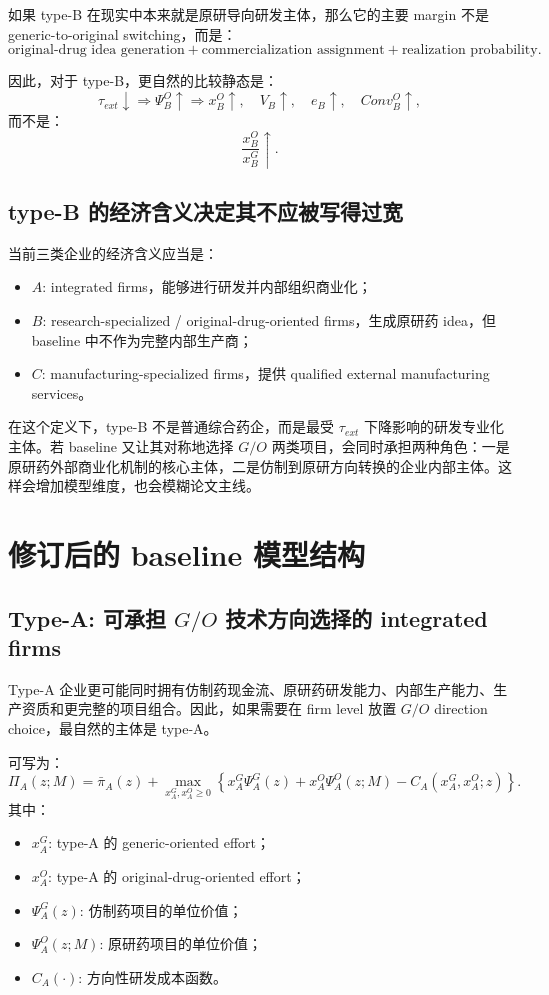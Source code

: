 \documentclass[12pt]{article}
\begin{document}
如果 type-B 在现实中本来就是原研导向研发主体，那么它的主要 margin 不是 generic-to-original switching，而是：
\[
\text{original-drug idea generation}
+
\text{commercialization assignment}
+
\text{realization probability}.
\]

因此，对于 type-B，更自然的比较静态是：
\[
\tau_{ext}\downarrow
\Rightarrow
\Psi_B^O\uparrow
\Rightarrow
x_B^O\uparrow,\quad V_B\uparrow,\quad e_B\uparrow,\quad Conv_B^O\uparrow,
\]
而不是：
\[
\frac{x_B^O}{x_B^G}\uparrow.
\]

\subsection{type-B 的经济含义决定其不应被写得过宽}

当前三类企业的经济含义应当是：
\begin{itemize}
    \item $A$: integrated firms，能够进行研发并内部组织商业化；
    \item $B$: research-specialized / original-drug-oriented firms，生成原研药 idea，但 baseline 中不作为完整内部生产商；
    \item $C$: manufacturing-specialized firms，提供 qualified external manufacturing services。
\end{itemize}

在这个定义下，type-B 不是普通综合药企，而是最受 $\tau_{ext}$ 下降影响的研发专业化主体。若 baseline 又让其对称地选择 $G/O$ 两类项目，会同时承担两种角色：一是原研药外部商业化机制的核心主体，二是仿制到原研方向转换的企业内部主体。这样会增加模型维度，也会模糊论文主线。

\section{修订后的 baseline 模型结构}

\subsection{Type-A: 可承担 $G/O$ 技术方向选择的 integrated firms}

Type-A 企业更可能同时拥有仿制药现金流、原研药研发能力、内部生产能力、生产资质和更完整的项目组合。因此，如果需要在 firm level 放置 $G/O$ direction choice，最自然的主体是 type-A。

可写为：
\[
\Pi_A(z;M)
=
\bar{\pi}_A(z)
+
\max_{x_A^G,x_A^O\ge 0}
\left\{
x_A^G\Psi_A^G(z)
+
x_A^O\Psi_A^O(z;M)
-
C_A(x_A^G,x_A^O;z)
\right\}.
\]
其中：
\begin{itemize}
    \item $x_A^G$: type-A 的 generic-oriented effort；
    \item $x_A^O$: type-A 的 original-drug-oriented effort；
    \item $\Psi_A^G(z)$: 仿制药项目的单位价值；
    \item $\Psi_A^O(z;M)$: 原研药项目的单位价值；
    \item $C_A(\cdot)$: 方向性研发成本函数。
\end{itemize}
\end{document}
